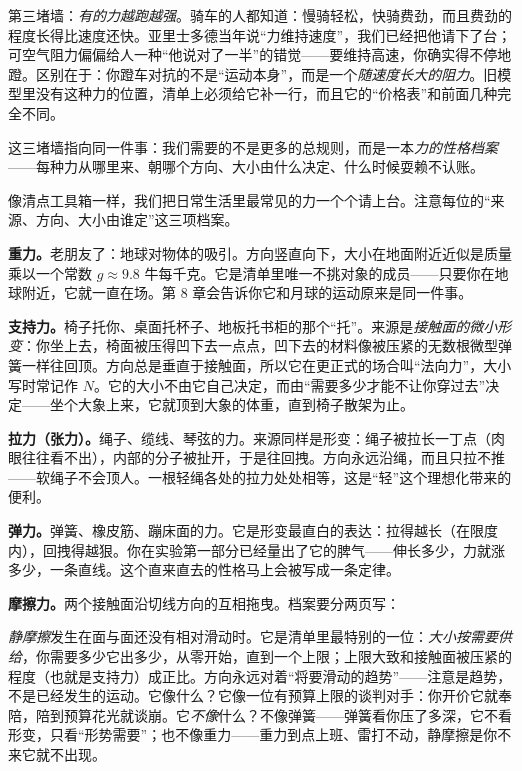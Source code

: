 第三堵墙：\emph{有的力越跑越强}。骑车的人都知道：慢骑轻松，快骑费劲，而且费劲的程度长得比速度还快。亚里士多德当年说“力维持速度”，我们已经把他请下了台；可空气阻力偏偏给人一种“他说对了一半”的错觉——要维持高速，你确实得不停地蹬。区别在于：你蹬车对抗的不是“运动本身”，而是一个\emph{随速度长大的阻力}。旧模型里没有这种力的位置，清单上必须给它补一行，而且它的“价格表”和前面几种完全不同。

这三堵墙指向同一件事：我们需要的不是更多的总规则，而是一本\emph{力的性格档案}——每种力从哪里来、朝哪个方向、大小由什么决定、什么时候耍赖不认账。


像清点工具箱一样，我们把日常生活里最常见的力一个个请上台。注意每位的“来源、方向、大小由谁定”这三项档案。

\textbf{重力。}老朋友了：地球对物体的吸引。方向竖直向下，大小在地面附近近似是质量乘以一个常数 \(g\approx9.8\) 牛每千克。它是清单里唯一不挑对象的成员——只要你在地球附近，它就一直在场。第 8 章会告诉你它和月球的运动原来是同一件事。

\textbf{支持力。}椅子托你、桌面托杯子、地板托书柜的那个“托”。来源是\emph{接触面的微小形变}：你坐上去，椅面被压得凹下去一点点，凹下去的材料像被压紧的无数根微型弹簧一样往回顶。方向总是垂直于接触面，所以它在更正式的场合叫“法向力”，大小写时常记作 \(N\)。它的大小不由它自己决定，而由“需要多少才能不让你穿过去”决定——坐个大象上来，它就顶到大象的体重，直到椅子散架为止。

\textbf{拉力（张力）。}绳子、缆线、琴弦的力。来源同样是形变：绳子被拉长一丁点（肉眼往往看不出），内部的分子被扯开，于是往回拽。方向永远沿绳，而且只拉不推——软绳子不会顶人。一根轻绳各处的拉力处处相等，这是“轻”这个理想化带来的便利。

\textbf{弹力。}弹簧、橡皮筋、蹦床面的力。它是形变最直白的表达：拉得越长（在限度内），回拽得越狠。你在实验第一部分已经量出了它的脾气——伸长多少，力就涨多少，一条直线。这个直来直去的性格马上会被写成一条定律。

\textbf{摩擦力。}两个接触面沿切线方向的互相拖曳。档案要分两页写：

\emph{静摩擦}发生在面与面还没有相对滑动时。它是清单里最特别的一位：\emph{大小按需要供给}，你需要多少它出多少，从零开始，直到一个上限；上限大致和接触面被压紧的程度（也就是支持力）成正比。方向永远对着“将要滑动的趋势”——注意是趋势，不是已经发生的运动。它像什么？它像一位有预算上限的谈判对手：你开价它就奉陪，陪到预算花光就谈崩。它\emph{不像}什么？不像弹簧——弹簧看你压了多深，它不看形变，只看“形势需要”；也不像重力——重力到点上班、雷打不动，静摩擦是你不来它就不出现。


